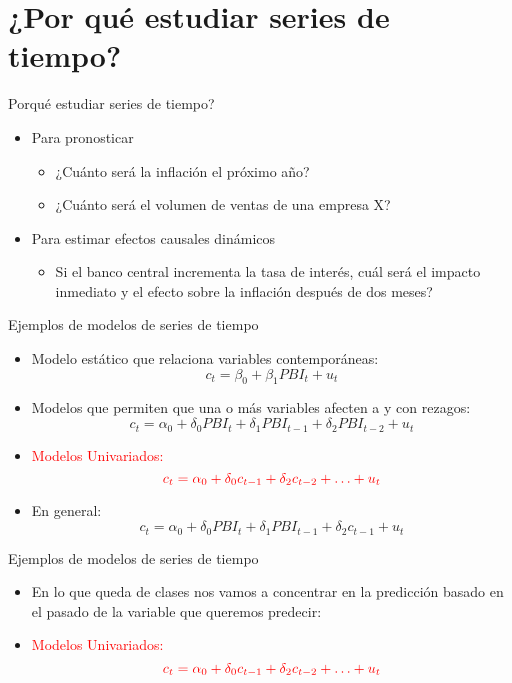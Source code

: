 \section{¿Por qué estudiar series de tiempo?}

\begin{frame}{Porqué estudiar series de tiempo?}
	\begin{itemize}
		\item Para pronosticar
			\begin{itemize}
				\item ¿Cuánto será la inflación el próximo año?
				\item ¿Cuánto será el volumen de ventas de una empresa X?
			\end{itemize}
		\item Para estimar efectos causales dinámicos
			\begin{itemize}
				\item Si el banco central incrementa la tasa de interés, cuál será el impacto inmediato y el efecto sobre la inflación después de dos meses?
			\end{itemize}
	\end{itemize}
\end{frame}
\begin{frame}{Ejemplos de modelos de series de tiempo}
	\begin{itemize}
		\item Modelo estático que relaciona variables contemporáneas:
			$$c_t = \beta_0 + \beta_1PBI_t + u_t$$
		\item Modelos que permiten que una o más variables afecten a y con rezagos:
			$$c_t = \alpha_0 + \delta_0 PBI_t + \delta_1 PBI_{t-1} + \delta_2 PBI_{t-2} + u_t$$
		\item \textcolor{red}{Modelos Univariados:}
			$$\textcolor{red}{c_t = \alpha_0 + \delta_0 c_{t-1} + \delta_2 c_{t-2} + \ldots + u_t}$$
		\item En general:
			$$c_t = \alpha_0 + \delta_0 PBI_t + \delta_1 PBI_{t-1} + \delta_2 c_{t-1} + u_t$$
	\end{itemize}
\end{frame}
\begin{frame}{Ejemplos de modelos de series de tiempo}
	\begin{itemize}
		\item En lo que queda de clases nos vamos a concentrar en la predicción basado en el pasado de la variable que queremos predecir:
		\item \textcolor{red}{Modelos Univariados:}
			$$\textcolor{red}{c_t = \alpha_0 + \delta_0 c_{t-1} + \delta_2 c_{t-2} + \ldots + u_t}$$
	\end{itemize}
\end{frame}